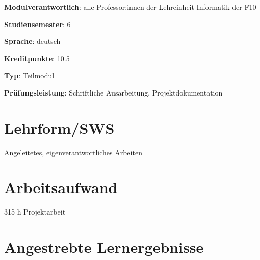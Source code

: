 \begin{modulHead}
\textbf{Modulverantwortlich}: alle Professor:innen
der Lehreinheit Informatik der
F10
\end{modulHead}
\begin{modulHead}
\textbf{Studiensemester}:
6
\end{modulHead}
\begin{modulHead}
\textbf{Sprache}:
deutsch
\end{modulHead}
\begin{modulHead}
\textbf{Kreditpunkte}:
10.5
\end{modulHead}
\begin{modulHead}
\textbf{Typ}:
Teilmodul
\end{modulHead}
\begin{modulHead}
\textbf{Prüfungsleistung}:
Schriftliche Ausarbeitung, Projektdokumentation
\end{modulHead}


\hypertarget{lehrformswspathlabelmi-2017modulbeschreibungen-bachelorba_praxisprojektarbeit}{%
\section*{Lehrform/SWS\label{/mi-2017/modulbeschreibungen-bachelor/BA_Praxisprojektarbeit}}\label{lehrformswspathlabelmi-2017modulbeschreibungen-bachelorba_praxisprojektarbeit}}

Angeleitetes, eigenverantwortliches Arbeiten

\hypertarget{arbeitsaufwandpathlabelmi-2017modulbeschreibungen-bachelorba_praxisprojektarbeit}{%
\section*{Arbeitsaufwand\label{/mi-2017/modulbeschreibungen-bachelor/BA_Praxisprojektarbeit}}\label{arbeitsaufwandpathlabelmi-2017modulbeschreibungen-bachelorba_praxisprojektarbeit}}

315 h Projektarbeit

\hypertarget{angestrebte-lernergebnissepathlabelmi-2017modulbeschreibungen-bachelorba_praxisprojektarbeit}{%
\section*{Angestrebte
Lernergebnisse\label{/mi-2017/modulbeschreibungen-bachelor/BA_Praxisprojektarbeit}}\label{angestrebte-lernergebnissepathlabelmi-2017modulbeschreibungen-bachelorba_praxisprojektarbeit}}

